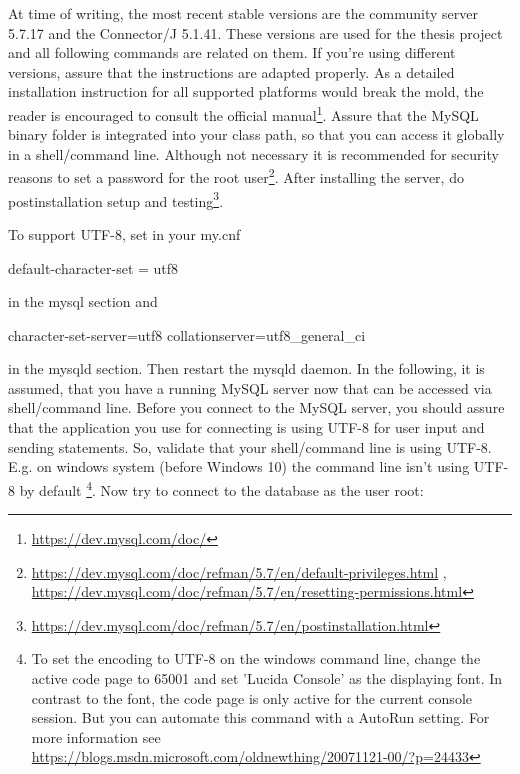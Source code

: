 At time of writing, the most recent stable versions are the community server 5.7.17 and the Connector/J 5.1.41. These versions are used for the thesis project and all following commands are related on them. If you're using 
different versions, assure that the instructions are adapted properly. As a detailed installation instruction for all supported platforms would break the mold, the reader is encouraged to consult the official 
manual\footnote{\url{https://dev.mysql.com/doc/}}. 
Assure that the MySQL binary folder is integrated into your class path, so that you can access it globally in a shell/command line. Although not necessary it is recommended for security reasons 
to set a password for the root user\footnote{\url{https://dev.mysql.com/doc/refman/5.7/en/default-privileges.html} , \url{https://dev.mysql.com/doc/refman/5.7/en/resetting-permissions.html}}. 
After installing the server, do postinstallation setup and testing\footnote{\url{https://dev.mysql.com/doc/refman/5.7/en/postinstallation.html}}. 

To support UTF-8, set in your my.cnf 

\begin{codebox}
	default-character-set = utf8
\end{codebox}

in the mysql section and

\begin{codebox}
	character-set-server=utf8\newline
	collation\-server=utf8\_general\_ci
\end{codebox}

in the mysqld section. Then restart the mysqld daemon. In the following, it is assumed, that you have a running MySQL server now that can be accessed via shell/command line. Before you connect to the MySQL server, you should assure that the application you use for connecting is using UTF-8 for user input and sending statements. So, validate that your shell/command line is using UTF-8. E.g. on windows system (before Windows 10) the command line isn't using UTF-8 by default
\footnote{To set the encoding to UTF-8 on the windows command line, change the active code page to 65001 and set 'Lucida Console' as the displaying font. In contrast to the font, the code page is only active for the current console session. But you can automate this command with a AutoRun setting. For more information see \url{https://blogs.msdn.microsoft.com/oldnewthing/20071121-00/?p=24433}}.  
Now try to connect to the database as the user root:

